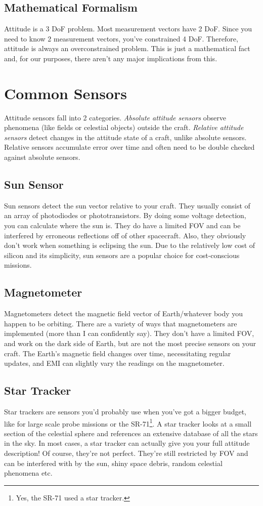 \documentclass[a4paper,14pt]{extreport}
\begin{document}
\subsection{Mathematical Formalism}
Attitude is a 3 DoF problem. Most measurement vectors have 2 DoF. Since you need to know 2 measurement vectors, you've constrained 4 DoF. Therefore, attitude is always an overconstrained problem. This is just a mathematical fact and, for our purposes, there aren't any major implications from this.
\section{Common Sensors}
Attitude sensors fall into 2 categories. \emph{Absolute attitude sensors} observe phenomena (like fields or celestial objects) outside the craft. \emph{Relative attitude sensors} detect changes in the attitude state of a craft, unlike absolute sensors. Relative sensors accumulate error over time and often need to be double checked against absolute sensors.
\subsection{Sun Sensor}
Sun sensors detect the sun vector relative to your craft. They usually consist of an array of photodiodes or phototransistors. By doing some voltage detection, you can calculate where the sun is. They do have a limited FOV and can be interfered by erroneous reflections off of other spacecraft. Also, they obviously don't work when something is eclipsing the sun. Due to the relatively low cost of silicon and its simplicity, sun sensors are a popular choice for cost-conscious missions.
\subsection{Magnetometer}
Magnetometers detect the magnetic field vector of Earth/whatever body you happen to be orbiting. There are a variety of ways that magnetometers are implemented (more than I can confidently say). They don't have a limited FOV, and work on the dark side of Earth, but are not the most precise sensors on your craft. The Earth's magnetic field changes over time, necessitating regular updates, and EMI can slightly vary the readings on the magnetometer.
\subsection{Star Tracker}
Star trackers are sensors you'd probably use when you've got a bigger budget, like for large scale probe missions or the SR-71\footnote{Yes, the SR-71 used a star tracker.}. A star tracker looks at a small section of the celestial sphere and references an extensive database of all the stars in the sky. In most cases, a star tracker can actually give you your full attitude description! Of course, they're not perfect. They're still restricted by FOV and can be interfered with by the sun, shiny space debris, random celestial phenomena etc.
\end{document}
